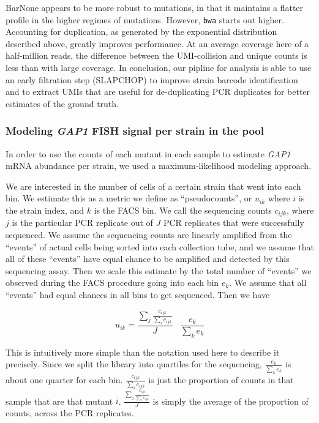 BarNone appears to be more robust to mutations, in that it maintains a
flatter profile in the higher regimes of mutations. However,
\texttt{bwa} starts out higher. Accounting for duplication, as generated
by the exponential distribution described above, greatly improves
performance. At an average coverage here of a half-million reads, the
difference between the UMI-collision and unique counts is less than
with large coverage.  
In conclusion, our pipline for analysis is able to use an early
filtration step (SLAPCHOP) to improve strain barcode
identification and to extract UMIs that are useful for de-duplicating
PCR duplicates for better estimates of the ground truth.

\subsubsection{Modeling \textit{GAP1} FISH signal per strain in the pool}

In order to use the counts of each mutant in each sample to estimate
\emph{GAP1} mRNA abundance per strain, we used a maximum-likelihood
modeling approach.

We are interested in the number of cells of a certain strain that went
into each bin. We estimate this as a metric we define as
``pseudocounts'', or \(u_{ik}\) where \(i\) is the strain index, and
\(k\) is the FACS bin. We call the sequencing counts \(c_{ijk}\), where
\(j\) is the particular PCR replicate out of \(J\) PCR replicates that
were successfully sequenced. We assume the sequencing counts are
linearly amplified from the ``events'' of actual cells being sorted into
each collection tube, and we assume that all of these ``events'' have
equal chance to be amplified and detected by this sequencing assay. Then
we scale this estimate by the total number of ``events'' we observed
during the FACS procedure going into each bin \(e_k\). We assume that
all ``events'' had equal chances in all bins to get sequenced. Then we
have

\[ u_{ik} = 
  \frac{ \sum_j \frac{c_{ijk}}{\sum_i c_{ijk}} }{J}
  \;\;\; \frac{ e_{k}}{\sum_{k} e_{k}} \]

This is intuitively more simple than the notation used here to describe
it precisely. Since we split the library into quartiles for the
sequencing, \(\frac{ e_{k}}{\sum_{k} e_{k}}\) is about one quarter for
each bin. \(\frac{ c_{ijk}}{\sum_{i} c_{ijk}}\) is just the proportion
of counts in that sample that are that mutant \(i\).
\(\frac{ \sum_j \frac{c_{ijk}}{\sum_i c_{ijk}} }{J}\) is simply the
average of the proportion of counts, across the PCR replicates.

